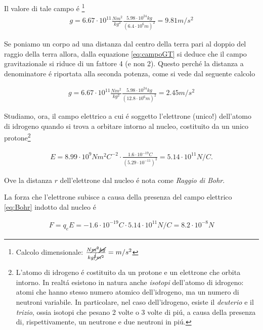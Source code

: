 \documentclass[17pt]{extarticle}
\begin{document}
Il valore di tale campo \'e \footnote{Calcolo dimensionale: $\frac{N\cancel{m}^2\cancel{kg} }{kg^{\cancel{2} }\cancel{m}^2} = m/s^2$}
\begin{eqnarray}\label{eq:campoGT}
 g = 6.67\cdot 10^{11}\frac{Nm^2}{kg^2}\frac{5.98\cdot 10^{24}kg}{(6.4\cdot 10^{6}m)^2} = 9.81m/s^2
\end{eqnarray}

Se poniamo un corpo ad una distanza dal centro della terra pari al doppio del raggio della terra allora, dalla equazione \ref{eq:campoGT} si deduce che il campo gravitazionale si riduce di un fattore 4 (e non 2). Questo perch\'e la distanza a denominatore \'e riportata alla seconda potenza, come si vede dal seguente calcolo


\begin{eqnarray}\label{eq:campoGT}
 g = 6.67\cdot 10^{11}\frac{Nm^2}{kg^2}\frac{5.98\cdot 10^{24}kg}{(12.8\cdot 10^{6}m)^2} = 2.45m/s^2
\end{eqnarray}

\vspace{2cm}

Studiamo, ora, il campo elettrico a cui \'e soggetto l'elettrone (unico!) dell'atomo di idrogeno quando si trova a orbitare intorno al nucleo, costituito da un unico protone\footnote{L'atomo di idrogeno \'e costituito da un protone e un elettrone che orbita intorno. In realt\'a esistono in natura anche \emph{isotopi} dell'atomo di idrogeno: atomi che hanno stesso numero atomico dell'idrogeno, ma un numero di neutroni variabile. In particolare, nel caso dell'idrogeno, esiste il \emph{deuterio} e il \emph{trizio}, ossia isotopi che pesano 2 volte o 3 volte di pi\'u, a causa della presenza di, rispettivamente, un neutrone e due neutroni in pi\'u.}


\begin{eqnarray}\label{eq:Bohr}
	E = 8.99\cdot 10^9Nm^2C^{-2}\cdot\frac{1.6\cdot 10^{-19}C }{(5.29\cdot 10^{-11})^2} = 5.14\cdot 10^{11}N/C.
\end{eqnarray}


Ove la distanza $r$ dell'elettrone dal nucleo \'e nota come \emph{Raggio di Bohr}.

La forza che l'elettrone subisce a causa della presenza del campo elettrico \ref{eq:Bohr} indotto dal nucleo \'e 


\begin{eqnarray}
	F = q_eE = -1.6\cdot 10^{-19}C\cdot 5.14\cdot 10^{11}N/C = 8.2\cdot 10^{-8} N
\end{eqnarray}
\end{document}
